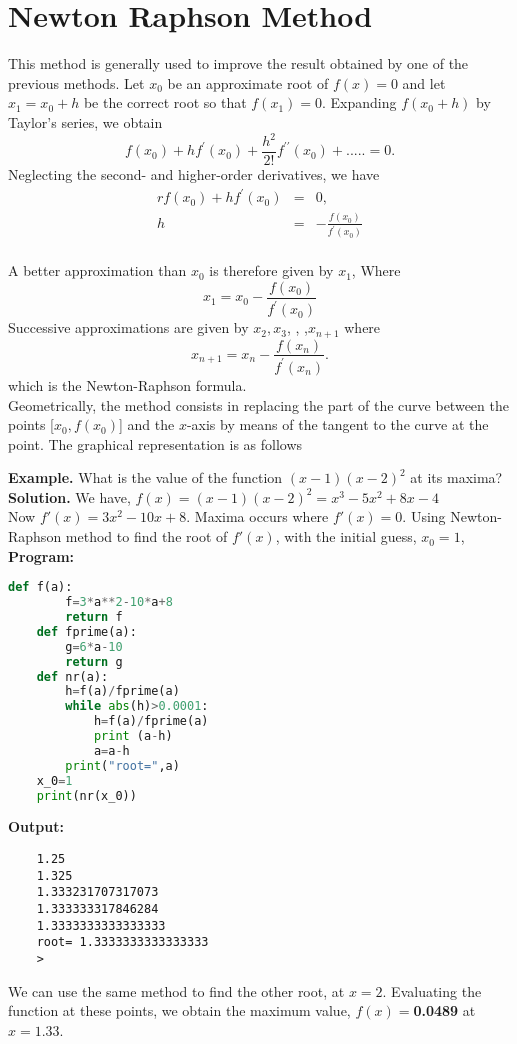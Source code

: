 \documentclass[12pt,a4paper,oneside]{book}
\begin{document}
\section{Newton Raphson Method}
\noindent 
This method is generally used to improve the result obtained by one of the previous methods. Let $x_0$ be an  approximate root of $f(x)=0$ and let $x_1=x_0+h$ be the correct root so that $f\left(x_1\right)=0$. Expanding $f\left(x_0+h\right)$ by Taylor's series, we obtain $$ f\left(x_0\right)+h f^{\prime}\left(x_0\right)+\frac{h^2}{2 !} f^{\prime \prime}\left(x_0\right)+.....=0 . $$ Neglecting the second- and higher-order derivatives, we have \begin{eqnarray*}{r} f\left(x_0\right)+h f^{\prime}\left(x_0\right)&=&0 , \\h&=&-\frac{f\left(x_0\right)}{f^{\prime}\left(x_0\right)} \end{eqnarray*}\\A better approximation than $x_0$ is therefore given by $x_1$, Where $$ x_1=x_0-\frac{f\left(x_0\right)}{f^{\prime}\left(x_0\right)} $$ Successive approximations are given by $x_2, x_3$, , ,$x_{n+1}$ where $$ x_{n+1}=x_n-\frac{f\left(x_n\right)}{f^{\prime}\left(x_n\right)} . $$ which is the Newton-Raphson formula.\\ 
Geometrically, the method consists in replacing the part of the curve between the points [$x_0,f(x_0)$] and the $x$-axis by means of the tangent to the curve at the point. The graphical representation is as follows 
\begin{center}

\end{center}
\noindent
{\bfseries Example.}
What is the value of the function $(x-1)(x-2)^2$ at its maxima?
\\[0.3cm]

\noindent \textbf{Solution.} We have, $f(x)=(x-1)(x-2)^2=x^3-5x^2+8x-4$\\
Now $f'(x) = 3x^2-10x+8$. Maxima occurs where $f'(x)=0$. 
Using Newton-Raphson method to find the root of $f'(x)$, with the initial guess, $x_0=1$,
\\[0.3cm]
\noindent\textbf{Program:}\\
\begin{lstlisting}[language=Python]
	def f(a):
		f=3*a**2-10*a+8
		return f
	def fprime(a):
		g=6*a-10
		return g
	def nr(a):
		h=f(a)/fprime(a)
		while abs(h)>0.0001:
			h=f(a)/fprime(a)
			print (a-h)
			a=a-h
		print("root=",a)
	x_0=1
	print(nr(x_0))
\end{lstlisting}
\textbf{Output:}
\begin{verbatim}
	1.25
	1.325
	1.333231707317073       
	1.333333317846284       
	1.3333333333333333      
	root= 1.3333333333333333
	>
\end{verbatim}
We can use the same method to find the other root, at $x=2$. Evaluating the function at these points, we obtain the maximum value, $f(x)=$\textbf{0.0489} at $x=1.33$. \\
\end{document}
